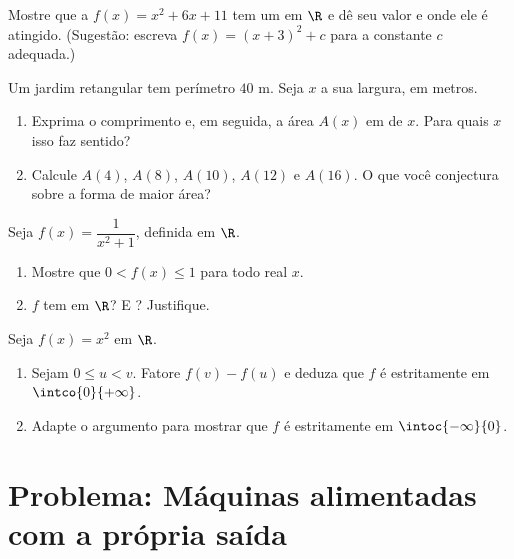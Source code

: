 \begin{exercise}[$\star\star$]\label{exo:g10:functions:7}
Mostre que a  $f(x) = x^2 + 6x + 11$ tem um  em $\R$ e dê seu
valor e onde ele é atingido. (Sugestão: escreva $f(x) = (x + 3)^2 + c$
para a constante $c$ adequada.)
\end{exercise}

\begin{exercise}[$\star\star$]\label{exo:g10:functions:8}
Um jardim retangular tem perímetro $40$ m. Seja $x$ a sua largura, em
metros.
\begin{enumerate}
  \item Exprima o comprimento e, em seguida, a área $A(x)$ em  de
        $x$. Para quais $x$ isso faz sentido?
  \item Calcule $A(4)$, $A(8)$, $A(10)$, $A(12)$ e $A(16)$. O que você
        conjectura sobre a forma de maior área?
\end{enumerate}
\end{exercise}

\begin{exercise}[$\star\star$]\label{exo:g10:functions:9}
Seja $f(x) = \dfrac{1}{x^2 + 1}$, definida em $\R$.
\begin{enumerate}
  \item Mostre que $0 < f(x) \leq 1$ para todo real $x$.
  \item $f$ tem  em $\R$? E ? Justifique.
\end{enumerate}
\end{exercise}

\begin{exercise}[$\star\star\star$]\label{exo:g10:functions:10}
Seja $f(x) = x^2$ em $\R$.
\begin{enumerate}
  \item Sejam $0 \leq u < v$. Fatore $f(v) - f(u)$ e deduza que $f$ é
        estritamente  em $\intco{0}{+\infty}$.
  \item Adapte o argumento para mostrar que $f$ é estritamente
         em $\intoc{-\infty}{0}$.
\end{enumerate}
\end{exercise}

\section{Problema: Máquinas alimentadas com a própria saída}

